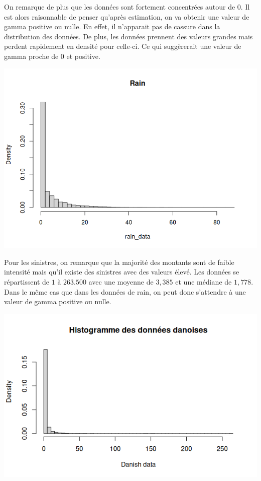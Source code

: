 \documentclass{article}
\theoremstyle{plain}
\theoremstyle{definition}
\theoremstyle{plain}
\begin{document}
On remarque de plus que les données sont fortement concentrées autour de 0.
Il est alors raisonnable de penser qu'après estimation, on va obtenir une valeur de gamma positive ou nulle. En effet, il n'apparait pas de cassure dans la distribution des données.
De plus, les données prennent des valeurs grandes mais perdent rapidement en densité pour celle-ci. Ce qui suggèrerait une valeur de gamma proche de $0$ et positive.

\begin{center}
	\includegraphics[scale=0.62]{./images/rainhisto.png} 
\end{center}


Pour les sinistres, on remarque que la majorité des montants sont de faible intensité mais qu'il existe des sinistres avec des valeurs élevé. Les données se répartissent de $1$ à $263.500$ avec une moyenne de $3,385$ et une médiane de $1,778$. Dans le même cas que dans les données de rain, on peut donc s'attendre à une valeur de gamma positive ou nulle.
\begin{center}
	\includegraphics[scale=0.62]{./images/sinistres.png} 
\end{center}
\end{document}
